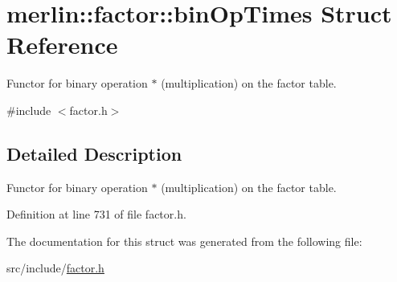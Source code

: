 \hypertarget{structmerlin_1_1factor_1_1binOpTimes}{}\section{merlin\+:\+:factor\+:\+:bin\+Op\+Times Struct Reference}
\label{structmerlin_1_1factor_1_1binOpTimes}


Functor for binary operation $\ast$ (multiplication) on the factor table.  




{\ttfamily \#include $<$factor.\+h$>$}



\subsection{Detailed Description}
Functor for binary operation $\ast$ (multiplication) on the factor table. 

Definition at line 731 of file factor.\+h.



The documentation for this struct was generated from the following file\+:\begin{DoxyCompactItemize}
\item 
src/include/\hyperlink{factor_8h}{factor.\+h}\end{DoxyCompactItemize}
